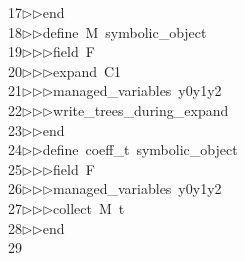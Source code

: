 \begin{tabbing}
17\>$\triangleright$\>$\triangleright$\>end\ \\[0pt]
18\>$\triangleright$\>$\triangleright$\>define\ M\ symbolic\_object\ \\[0pt]
19\>$\triangleright$\>$\triangleright$\>$\triangleright$\>field\ F\ \\[0pt]
20\>$\triangleright$\>$\triangleright$\>$\triangleright$\>expand\ C1\ \\[0pt]
21\>$\triangleright$\>$\triangleright$\>$\triangleright$\>managed\_variables\ y0y1y2\ \\[0pt]
22\>$\triangleright$\>$\triangleright$\>$\triangleright$\>write\_trees\_during\_expand\ \\[0pt]
23\>$\triangleright$\>$\triangleright$\>end\ \\[0pt]
24\>$\triangleright$\>$\triangleright$\>define\ coeff\_t\ symbolic\_object\ \\[0pt]
25\>$\triangleright$\>$\triangleright$\>$\triangleright$\>field\ F\ \\[0pt]
26\>$\triangleright$\>$\triangleright$\>$\triangleright$\>managed\_variables\ y0y1y2\ \\[0pt]
27\>$\triangleright$\>$\triangleright$\>$\triangleright$\>collect\ M\ t\ \\[0pt]
28\>$\triangleright$\>$\triangleright$\>end\\[0pt]
29\>\end{tabbing}
